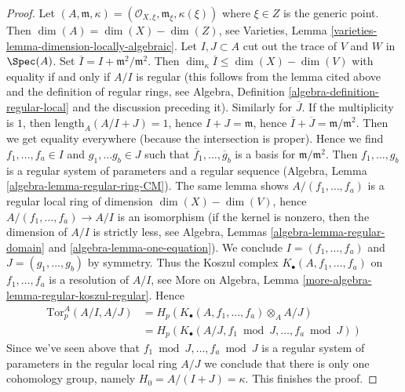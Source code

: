 \begin{proof}
Let $(A, \mathfrak m, \kappa) =
(\mathcal{O}_{X, \xi}, \mathfrak m_\xi, \kappa(\xi))$ where $\xi \in Z$
is the generic point. Then $\dim(A) = \dim(X) - \dim(Z)$, see
Varieties, Lemma \ref{varieties-lemma-dimension-locally-algebraic}.
Let $I, J \subset A$ cut out the trace of $V$ and $W$
in $\Spec(A)$. Set $\overline{I} = I + \mathfrak m^2/\mathfrak m^2$.
Then $\dim_\kappa \overline{I} \leq \dim(X) - \dim(V)$ with equality
if and only if $A/I$ is regular (this follows from the lemma cited
above and the definition of regular rings, see
Algebra, Definition \ref{algebra-definition-regular-local}
and the discussion preceding it). Similarly for $\overline{J}$.
If the multiplicity is $1$, then
$\text{length}_A(A/I + J) = 1$, hence $I + J = \mathfrak m$, hence
$\overline{I} + \overline{J} = \mathfrak m/\mathfrak m^2$.
Then we get equality everywhere (because the intersection is
proper). Hence we find $f_1, \ldots, f_a \in I$ and $g_1, \ldots g_b \in J$
such that $\overline{f}_1, \ldots, \overline{g}_b$ is a basis
for $\mathfrak m/\mathfrak m^2$. Then $f_1, \ldots, g_b$ is a
regular system of parameters and a regular sequence
(Algebra, Lemma \ref{algebra-lemma-regular-ring-CM}).
The same lemma shows $A/(f_1, \ldots, f_a)$ is a regular local ring
of dimension $\dim(X) - \dim(V)$, hence $A/(f_1, \ldots, f_a) \to A/I$
is an isomorphism (if the kernel is nonzero, then the dimension
of $A/I$ is strictly less, see
Algebra, Lemmas \ref{algebra-lemma-regular-domain} and
\ref{algebra-lemma-one-equation}).
We conclude $I = (f_1, \ldots, f_a)$ and $J = (g_1, \ldots, g_b)$
by symmetry. Thus the Koszul complex $K_\bullet(A, f_1, \ldots, f_a)$
on $f_1, \ldots, f_a$ is a resolution of $A/I$, see
More on Algebra, Lemma \ref{more-algebra-lemma-regular-koszul-regular}.
Hence
\begin{align*}
\text{Tor}_p^A(A/I, A/J)
& =
H_p(K_\bullet(A, f_1, \ldots, f_a) \otimes_A A/J) \\
& =
H_p(K_\bullet(A/J, f_1 \bmod J, \ldots, f_a \bmod J))
\end{align*}
Since we've seen above that $f_1 \bmod J, \ldots, f_a \bmod J$ is
a regular system of parameters in the regular local ring $A/J$
we conclude that there is only one cohomology group, namely
$H_0 = A/(I + J) = \kappa$. This finishes the proof.
\end{proof}

